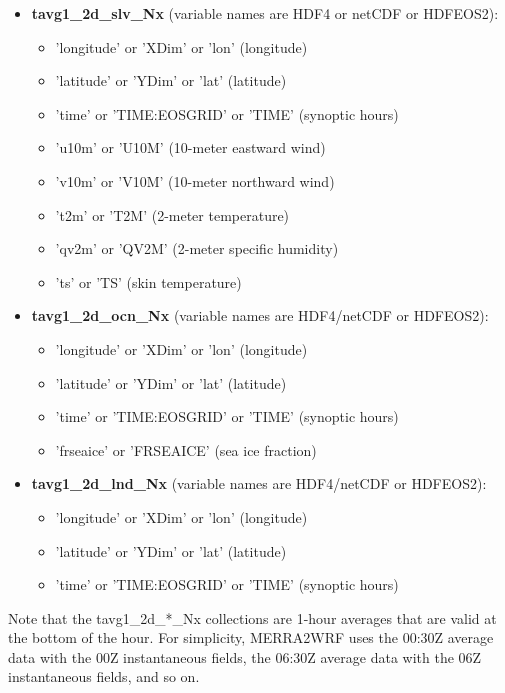 \begin{itemize}
\item \textbf{tavg1\_2d\_slv\_Nx}  (variable names are HDF4 or netCDF or 
HDFEOS2):
  \begin{itemize}
  \item 'longitude' or 'XDim'  or 'lon' (longitude)
  \item 'latitude' or 'YDim' or 'lat' (latitude)
  \item 'time' or 'TIME:EOSGRID' or 'TIME' (synoptic hours)
  \item 'u10m' or 'U10M' (10-meter eastward wind)
  \item 'v10m' or 'V10M' (10-meter northward wind)
  \item 't2m' or 'T2M' (2-meter temperature)
  \item 'qv2m' or 'QV2M' (2-meter specific humidity)
  \item 'ts' or 'TS' (skin temperature)
  \end{itemize}

\item \textbf{tavg1\_2d\_ocn\_Nx} (variable names are HDF4/netCDF or HDFEOS2):
  \begin{itemize}
  \item 'longitude' or 'XDim' or 'lon' (longitude)
  \item 'latitude' or 'YDim' or 'lat' (latitude)
  \item 'time' or 'TIME:EOSGRID' or 'TIME' (synoptic hours)
  \item 'frseaice' or 'FRSEAICE' (sea ice fraction)
  \end{itemize}

\item \textbf{tavg1\_2d\_lnd\_Nx} (variable names are HDF4/netCDF or HDFEOS2):
  \begin{itemize}
  \item 'longitude' or 'XDim' or 'lon' (longitude)
  \item 'latitude' or 'YDim' or 'lat' (latitude)
  \item 'time' or 'TIME:EOSGRID' or 'TIME' (synoptic hours)
  \end{itemize}

\end{itemize}

Note that the tavg1\_2d\_*\_Nx collections are 1-hour 
averages that are valid at the bottom of the hour. For simplicity, MERRA2WRF
uses the 00:30Z average data with the 00Z instantaneous fields, the 06:30Z
average data with the 06Z instantaneous fields, and so on.

